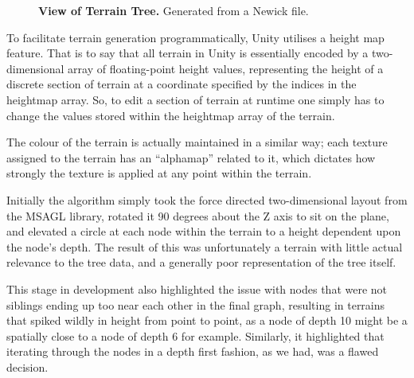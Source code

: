 \documentclass[10pt,letterpaper]{article}
\begin{document}
\begin{figure}[h!]
\caption{{\bf View of Terrain Tree.} Generated from a Newick file.}
\label{fig2}
\end{figure}

To facilitate terrain generation programmatically, Unity utilises a height map feature. That is to say that all terrain in Unity is essentially encoded by a two-dimensional array of floating-point height values, representing the height of a discrete section of terrain at a coordinate specified by the indices in the heightmap array. So, to edit a section of terrain at runtime one simply has to change the values stored within the heightmap array of the terrain.

The colour of the terrain is actually maintained in a similar way; each texture assigned to the terrain has an “alphamap” related to it, which dictates how strongly the texture is applied at any point within the terrain.

Initially the algorithm simply took the force directed two-dimensional layout from the MSAGL library, rotated it 90 degrees about the Z axis to sit on the plane, and elevated a circle at each node within the terrain to a height dependent upon the node’s depth. The result of this was unfortunately a terrain with little actual relevance to the tree data, and a generally poor representation of the tree itself.

This stage in development also highlighted the issue with nodes that were not siblings ending up too near each other in the final graph, resulting in terrains that spiked wildly in height from point to point, as a node of depth 10 might be a spatially close to a node of depth 6 for example. Similarly, it highlighted that iterating through the nodes in a depth first fashion, as we had, was a flawed decision.
\end{document}
